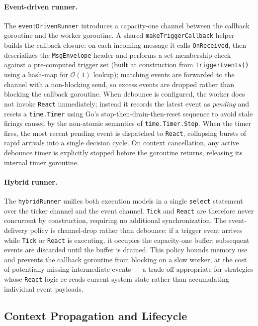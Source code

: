 \paragraph{Event-driven runner.}
The \texttt{eventDrivenRunner} introduces a capacity-one channel between the
callback goroutine and the worker goroutine.
A shared \texttt{makeTriggerCallback} helper builds the callback closure: on
each incoming message it calls \texttt{OnReceived}, then deserializes the
\texttt{MsgEnvelope} header and performs a set-membership check against a
pre-computed trigger set (built at construction from \texttt{TriggerEvents()}
using a hash-map for $\mathcal{O}(1)$ lookup); matching events are forwarded to
the channel with a non-blocking send, so excess events are dropped rather than
blocking the callback goroutine.
When debounce is configured, the worker does not invoke \texttt{React}
immediately; instead it records the latest event as \emph{pending} and resets a
\texttt{time.Timer} using Go's stop-then-drain-then-reset sequence to avoid
stale firings caused by the non-atomic semantics of
\texttt{time.Timer.Stop}.
When the timer fires, the most recent pending event is dispatched to
\texttt{React}, collapsing bursts of rapid arrivals into a single decision
cycle.
On context cancellation, any active debounce timer is explicitly stopped before
the goroutine returns, releasing its internal timer goroutine.

\paragraph{Hybrid runner.}
The \texttt{hybridRunner} unifies both execution models in a single
\texttt{select} statement over the ticker channel and the event channel.
\texttt{Tick} and \texttt{React} are therefore never concurrent by construction,
requiring no additional synchronization.
The event-delivery policy is channel-drop rather than debounce: if a trigger
event arrives while \texttt{Tick} or \texttt{React} is executing, it occupies
the capacity-one buffer; subsequent events are discarded until the buffer is
drained.
This policy bounds memory use and prevents the callback goroutine from blocking
on a slow worker, at the cost of potentially missing intermediate events — a
trade-off appropriate for strategies whose \texttt{React} logic re-reads current
system state rather than accumulating individual event payloads.

\subsection{Context Propagation and Lifecycle}
\label{subsec:context}

